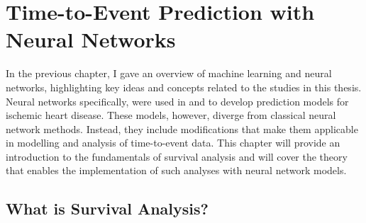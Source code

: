 \chapter{Time-to-Event Prediction with Neural Networks}
\label{chap:survival-analysis}


In the previous chapter, 
I gave an overview of machine learning and neural networks,
highlighting key ideas and concepts related to the studies in this thesis.
Neural networks specifically, 
were used in \studyii{} and \studyiii{} to develop
prediction models for ischemic heart disease.
These models, however, diverge from classical neural network methods.
Instead, they include modifications that make them applicable
in modelling and analysis of time-to-event data.
This chapter will provide an introduction to the fundamentals
of survival analysis and will cover the
theory that enables the implementation of such analyses with
neural network models.

\section{What is Survival Analysis?}

